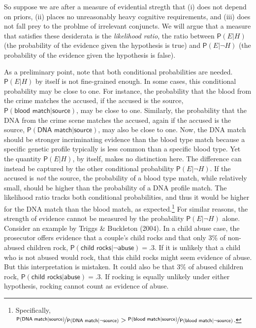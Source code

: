 \documentclass[
  10pt,
  dvipsnames,enabledeprecatedfontcommands]{scrartcl}
\newcommand{\pr}[1]{\mathsf{P}(#1)}
\begin{document}
So suppose we are after a measure of evidential stregth that (i) does
not depend on priors, (ii) places no unreasonably heavy cognitive
requirements, and (iii) does not fall prey to the problme of irrelevant
conjuncts. We will argue that a measure that satisfies these desiderata
is the \emph{likelihood ratio}, the ratio between \(\pr{E \vert H}\)
(the probability of the evidence given the hypothesis is true) and
\(\pr{E \vert \neg H}\) (the probability of the evidence given the
hypothesis is false).

As a preliminary point, note that both conditional probabilities are
needed. \(\pr{E \vert H}\) by itself is not fine-grained enough. In some
cases, this conditional probability may be close to one. For instance,
the probability that the blood from the crime matches the accused, if
the accused is the source,
\(\pr{\textsf{blood match} \vert \textsf{source}}\), may be close to
one. Similarly, the probability that the DNA from the crime scene
matches the accused, again if the accused is the source,
\(\pr{\textsf{DNA match} \vert \textsf{source}}\), may also be close to
one. Now, the DNA match should be stronger incriminating evidence than
the blood type match because a specific genetic profile typically is
less common than a specific blood type. Yet the quantity
\(\pr{E \vert H}\), by itself, makes no distinction here. The difference
can instead be captured by the other conditional probability
\(\pr{E \vert \neg H}\). If the accused is \textit{not} the source, the
probability of a blood type match, while relatively small, should be
higher than the probability of a DNA profile match. The likelihood ratio
tracks both conditional probabilities, and thus it would be higher for
the DNA match than the blood match, as expected.\footnote{Specifically,
  \(\nicefrac{\pr{\textsf{DNA match} \vert \textsf{source}}}{\pr{\textsf{DNA match} \vert \neg \textsf{source}}} > \nicefrac{\pr{\textsf{blood match} \vert \textsf{source}}}{\pr{\textsf{blood match} \vert \neg \textsf{source}}}\).}
For similar reasons, the strength of evidence cannot be measured by the
probability \(\pr{E \vert \neg H}\) alone. Consider an example by Triggs
\& Buckleton (2004). In a child abuse case, the prosecutor offers
\label{text:rock} evidence that a couple's child rocks and that only 3\%
of non-abused children rock,
\(\pr{\textsf{child rocks} \vert \neg \textsf{abuse}}=.3\). If it is
unlikely that a child who is not abused would rock, that this child
rocks might seem evidence of abuse. But this interpretation is mistaken.
It could also be that 3\% of abused children rock,
\(\pr{\textsf{child rocks} \vert \textsf{abuse}}=.3\). If rocking is
equally unlikely under either hypothesis, rocking cannot count as
evidence of abuse.
\end{document}
